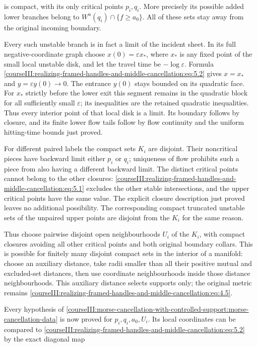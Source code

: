 is compact, with its only critical points \(p_i,q_i\). More precisely its possible added lower branches belong to \(W^u(q_i)\cap\{f\geq a_0\}\). All of these sets stay away from the original incoming boundary.

Every such unstable branch is in fact a limit of the incident sheet. In its full negative-coordinate graph choose \(x(0)=\varepsilon x_*\), where \(x_*\) is any fixed point of the small local unstable disk, and let the travel time be \(-\log\varepsilon\). Formula \eqref{courseIII:realizing-framed-handles-and-middle-cancellation:eq:5.2} gives \(x=x_*\) and \(y=\varepsilon y(0)\to0\). The entrance \(y(0)\) stays bounded on its quadratic face. For \(x_*\) strictly before the lower exit this segment remains in the quadratic block for all sufficiently small \(\varepsilon\); its inequalities are the retained quadratic inequalities. Thus every interior point of that local disk is a limit. Its boundary follows by closure, and its finite lower flow tails follow by flow continuity and the uniform hitting-time bounds just proved.

For different paired labels the compact sets \(K_i\) are disjoint. Their noncritical pieces have backward limit either \(p_i\) or \(q_i\); uniqueness of flow prohibits such a piece from also having a different backward limit. The distinct critical points cannot belong to the other closures: \eqref{courseIII:realizing-framed-handles-and-middle-cancellation:eq:5.1} excludes the other stable intersections, and the upper critical points have the same value. The explicit closure description just proved leaves no additional possibility. The corresponding compact truncated unstable sets of the unpaired upper points are disjoint from the \(K_i\) for the same reason.

Thus choose pairwise disjoint open neighbourhoods \(U_i\) of the \(K_i\), with compact closures avoiding all other critical points and both original boundary collars. This is possible for finitely many disjoint compact sets in the interior of a manifold: choose an auxiliary distance, take radii smaller than all their positive mutual and excluded-set distances, then use coordinate neighbourhoods inside those distance neighbourhoods. This auxiliary distance selects supports only; the original metric remains \eqref{courseIII:realizing-framed-handles-and-middle-cancellation:eq:4.5}.

Every hypothesis of \cref{courseIII:morse-cancellation-with-controlled-support:morse-cancellation-data} is now proved for \(p_i,q_i,a_0,U_i\). Its local coordinates can be compared to \eqref{courseIII:realizing-framed-handles-and-middle-cancellation:eq:5.2} by the exact diagonal map

